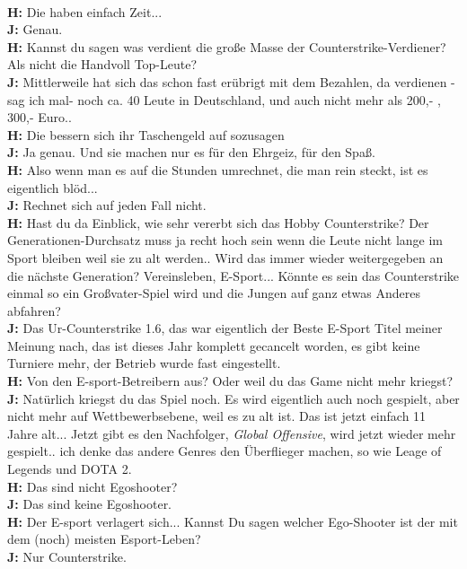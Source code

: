 \\ \textbf{H:} Die haben einfach Zeit...
\\ \textbf{J:} Genau.
\\ \textbf{H:} Kannst du sagen was verdient die große Masse der Counterstrike-Verdiener? Als nicht die Handvoll Top-Leute?
\\ \textbf{J:} Mittlerweile hat sich das schon fast erübrigt mit dem Bezahlen, da verdienen -sag ich mal- noch ca. 40 Leute in Deutschland, und auch nicht mehr als 200,- , 300,- Euro..
\\ \textbf{H:} Die bessern sich ihr Taschengeld auf sozusagen
\\ \textbf{J:} Ja genau. Und sie machen nur es für den Ehrgeiz, für den Spaß.
\\ \textbf{H:} Also wenn man es auf die Stunden umrechnet, die man rein steckt, ist es eigentlich blöd...
\\ \textbf{J:} Rechnet sich auf jeden Fall nicht.
\\ \textbf{H:} Hast du da Einblick, wie sehr vererbt sich das Hobby Counterstrike? Der  Generationen-Durchsatz muss ja recht hoch sein wenn die Leute nicht lange im Sport bleiben weil sie zu alt werden.. Wird das immer wieder weitergegeben an die nächste Generation? Vereinsleben, E-Sport... Könnte es sein das Counterstrike einmal so ein Großvater-Spiel wird und die Jungen auf ganz etwas Anderes abfahren?
\\ \textbf{J:} Das Ur-Counterstrike 1.6, das war eigentlich der Beste E-Sport Titel meiner Meinung nach, das ist dieses Jahr komplett gecancelt worden, es gibt keine Turniere mehr, der Betrieb wurde fast eingestellt.
\\ \textbf{H:} Von den E-sport-Betreibern aus? Oder weil du das Game nicht mehr kriegst?
\\ \textbf{J:} Natürlich kriegst du das Spiel noch. Es wird eigentlich auch noch gespielt, aber nicht mehr auf Wettbewerbsebene, weil es zu alt ist. Das ist jetzt einfach 11 Jahre alt... Jetzt gibt es den Nachfolger, \textit{Global Offensive}, wird jetzt wieder mehr gespielt.. ich denke das andere Genres den Überflieger machen, so wie Leage of Legends und DOTA 2.
\\ \textbf{H:} Das sind nicht Egoshooter?
\\ \textbf{J:} Das sind keine Egoshooter.
\\ \textbf{H:} Der E-sport verlagert sich... Kannst Du sagen welcher Ego-Shooter ist der mit dem (noch) meisten Esport-Leben?
\\ \textbf{J:} Nur Counterstrike.
